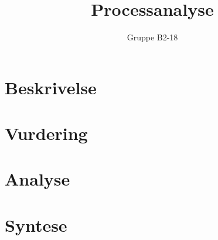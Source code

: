 \documentclass[hidelinks, 12pt]{article}
\begin{document}
	\title{Processanalyse}
	\author{Gruppe B2-18}
	\maketitle

	\section*{Beskrivelse}
	
	\section*{Vurdering}
	
	\section*{Analyse}
	
	\section*{Syntese}
	
	
\end{document}
